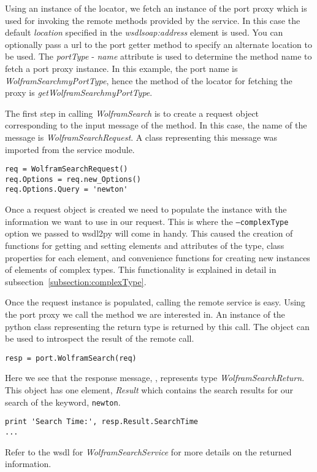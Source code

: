 Using an instance of the locator, we fetch an instance of the port proxy
which is used for invoking the remote methods provided by the service.  In
this case the default {\it location} specified in the {\it wsdlsoap:address}
element is used.  You can optionally pass a url to the port getter method to
specify an alternate location to be used.  The {\it portType} - {\it name} 
attribute is used to determine the method name to fetch a port proxy instance.
In this example, the port name is {\it WolframSearchmyPortType}, hence the 
method of the locator for fetching the proxy is {\it getWolframSearchmyPortType}.

The first step in calling {\it WolframSearch} is to create a request object
corresponding to the input message of the method.  In this case, the name of
the message is {\it WolframSearchRequest}.  A class representing this message
was imported from the service module.

\begin{verbatim}
req = WolframSearchRequest()
req.Options = req.new_Options()
req.Options.Query = 'newton'
\end{verbatim}

Once a request object is created we need to populate the instance with the
information we want to use in our request.  This is where the {\tt --complexType}
option we passed to wsdl2py will come in handy.  This caused the creation of 
functions for getting and setting elements and attributes of the type, class 
properties for each element, and convenience functions for creating new instances
of elements of complex types.  This functionality is explained in detail in 
subsection~\ref{subsection:complexType}.

Once the request instance is populated, calling the remote service is easy.  Using
the port proxy we call the method we are interested in.  An instance of the python
class representing the return type is returned by this call.  The  object
can be used to introspect the result of the remote call.

\begin{verbatim}
resp = port.WolframSearch(req)
\end{verbatim}

Here we see that the response message, , represents type {\it WolframSearchReturn}.
This object has one element, {\it Result} which contains the search results for our
search of the keyword, {\tt newton}.

\begin{verbatim}
print 'Search Time:', resp.Result.SearchTime
...
\end{verbatim}

Refer to the wsdl for {\it WolframSearchService} for more details on the returned information.